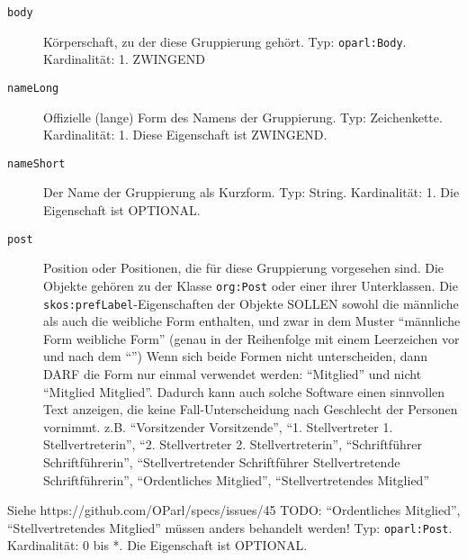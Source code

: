 \documentclass[,a4paper]{article}
\begin{document}
\begin{description}
\item[\texttt{body}]
Körperschaft, zu der diese Gruppierung gehört. Typ: \texttt{oparl:Body}.
Kardinalität: 1. ZWINGEND
\item[\texttt{nameLong}]
Offizielle (lange) Form des Namens der Gruppierung. Typ: Zeichenkette.
Kardinalität: 1. Diese Eigenschaft ist ZWINGEND.
\item[\texttt{nameShort}]
Der Name der Gruppierung als Kurzform. Typ: String. Kardinalität: 1. Die
Eigenschaft ist OPTIONAL.
\item[\texttt{post}]
Position oder Positionen, die für diese Gruppierung vorgesehen sind. Die
Objekte gehören zu der Klasse \texttt{org:Post} oder einer ihrer
Unterklassen. Die \texttt{skos:prefLabel}-Eigenschaften der Objekte
SOLLEN sowohl die männliche als auch die weibliche Form enthalten, und
zwar in dem Muster ``männliche Form \textbar{} weibliche Form'' (genau
in der Reihenfolge mit einem Leerzeichen vor und nach dem
``\textbar{}'') Wenn sich beide Formen nicht unterscheiden, dann DARF
die Form nur einmal verwendet werden: ``Mitglied'' und nicht ``Mitglied
\textbar{} Mitglied''. Dadurch kann auch solche Software einen
sinnvollen Text anzeigen, die keine Fall-Unterscheidung nach Geschlecht
der Personen vornimmt. z.B. ``Vorsitzender \textbar{} Vorsitzende'',
``1. Stellvertreter \textbar{} 1. Stellvertreterin'', ``2.
Stellvertreter \textbar{} 2. Stellvertreterin'', ``Schriftführer
\textbar{} Schriftführerin'', ``Stellvertretender Schriftführer
\textbar{} Stellvertretende Schriftführerin'', ``Ordentliches
Mitglied'', ``Stellvertretendes Mitglied''
\end{description}

Siehe https://github.com/OParl/specs/issues/45 TODO: ``Ordentliches
Mitglied'', ``Stellvertretendes Mitglied'' müssen anders behandelt
werden! Typ: \texttt{oparl:Post}. Kardinalität: 0 bis *. Die Eigenschaft
ist OPTIONAL.
\end{document}
